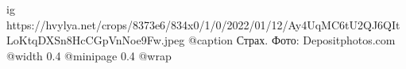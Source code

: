  
 
 
 
 

\ifcmt
  ig https://hvylya.net/crops/8373e6/834x0/1/0/2022/01/12/Ay4UqMC6tU2QJ6QItLoKtqDXSn8HcCGpVnNoe9Fw.jpeg
  @caption Страх. Фото: Depositphotos.com
  @width 0.4
  @minipage 0.4
  @wrap \parpic[r]
\fi
